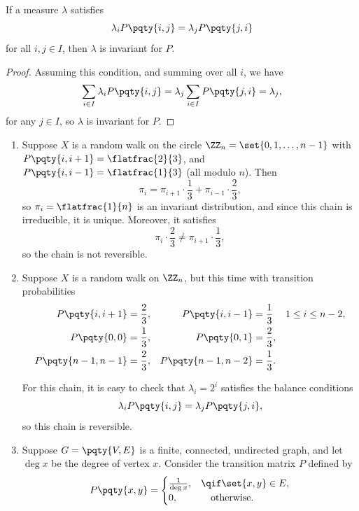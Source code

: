 \begin{lemma}
    If a measure \(\lambda\) satisfies
    \[
        \lambda_i P\pqty{i, j} = \lambda_j P\pqty{j, i}
    \]
    for all \(i, j \in I\), then \(\lambda\) is invariant for \(P\).
\end{lemma}

\begin{proof}
    Assuming this condition, and summing over all \(i\), we have
    \[
        \sum_{i \in I} \lambda_i P\pqty{i, j} = \lambda_j \sum_{i \in I} P\pqty{j, i} = \lambda_j,
    \]
    for any \(j \in I\), so \(\lambda\) is invariant for \(P\).
\end{proof}

\begin{examples}
    \begin{enumerate}
        \item Suppose \(X\) is a random walk on the circle \(\ZZ_n = \set{0, 1, \ldots, n - 1}\) with \(P\pqty{i, i + 1} = \flatfrac{2}{3}\), and \(P\pqty{i, i - 1} = \flatfrac{1}{3}\) (all modulo \(n\)). Then
        \[
            \pi_i = \pi_{i + 1} \cdot \frac{1}{3} + \pi_{i - 1} \cdot \frac{2}{3},
        \]
        so \(\pi_i = \flatfrac{1}{n}\) is an invariant distribution, and since this chain is irreducible, it is unique. Moreover, it satisfies
        \[
            \pi_i \cdot \frac{2}{3} \neq \pi_{i + 1} \cdot \frac{1}{3},
        \]
        so the chain is not reversible.

        \item Suppose \(X\) is a random walk on \(\ZZ_n\), but this time with transition probabilities
        \begin{align*}
            P\pqty{i, i + 1} &= \frac{2}{3}, &  P\pqty{i, i - 1} &= \frac{1}{3} && 1 \leq i \leq n - 2, \\
            P\pqty{0, 0} &= \frac{1}{3}, & P\pqty{0, 1} &= \frac{2}{3}, \\
            P\pqty{n - 1, n - 1} &= \frac{2}{3}, & P\pqty{n - 1, n - 2} &= \frac{1}{3}. \\
        \end{align*}

        For this chain, it is easy to check that \(\lambda_i = 2^i\) satisfies the balance conditions
        \[
            \lambda_i P\pqty{i, j} = \lambda_{j} P\pqty{j, i},
        \]
        so this chain is reversible.

        \item Suppose \(G = \pqty{V, E}\) is a finite, connected, undirected graph, and let \(\deg x\) be the degree of vertex \(x\).  Consider the transition matrix \(P\) defined by
        \[
            P\pqty{x, y} = \begin{cases}
                \frac{1}{\deg x}, & \qif \set{x, y} \in E, \\
                0, & \quad\text{otherwise}.
            \end{cases}
        \]


\end{enumerate}
\end{examples}
